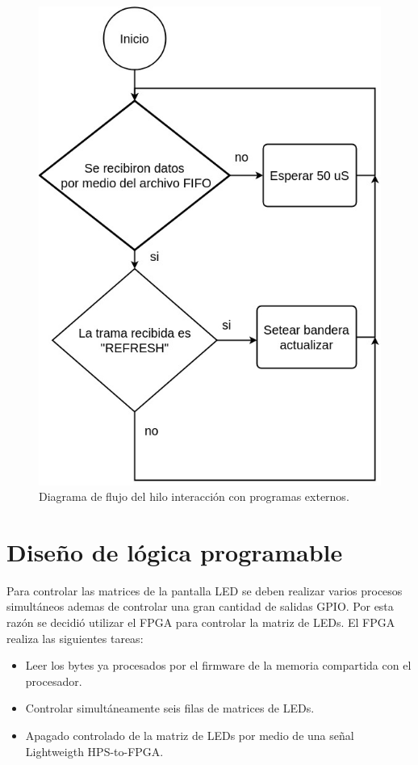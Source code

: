 \begin{figure}[htpb]
	\centering
	\includegraphics[scale=0.7]{Figures/hilo3.jpg} 
	\caption{Diagrama de flujo del hilo interacción con programas externos.}
	\label{fig: hilofifo}
\end{figure}
\pagebreak

\section{ Diseño de lógica programable}
Para controlar las matrices de la pantalla LED se deben realizar varios procesos simultáneos ademas de controlar una gran cantidad de salidas GPIO. Por esta razón se decidió utilizar el FPGA para controlar la matriz de LEDs.
El FPGA realiza las siguientes tareas:
\begin{itemize}
\item Leer los bytes ya procesados por el firmware de la memoria compartida con el procesador. 
\item Controlar simultáneamente seis filas de matrices de LEDs.
\item Apagado controlado de la matriz de LEDs por medio de una señal Lightweigth HPS-to-FPGA.
\end{itemize}

